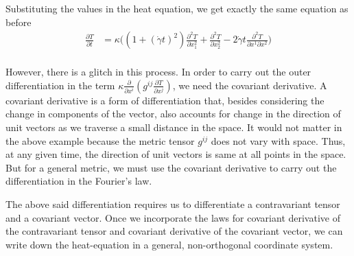 \documentclass[11pt, letterpaper]{article}
\newcommand{\1}{\bm{1}}
\newcommand{\gd}{\dot \gamma}
\newcommand{\pd}[2]{\frac{\partial #1}{\partial #2}}
\begin{document}
Substituting the values in the heat equation, we get exactly the same equation as before
\begin{align*}
\pd{T}{t} &= \kappa \bigg((1+(\gd t)^2)\pd{^2T}{x_1^2}+\pd{^2T}{x_2^2} - 2\gd t \pd{^2T}{x^1 \partial x^2} \bigg) \\
\end{align*}

However, there is a glitch in this process. In order to carry out the outer differentiation in the term $\kappa \pd{}{x^i}(g^{ij} \pd{T}{x^j})$, we need the covariant derivative. A covariant derivative is a form of differentiation that, besides considering the change in components of the vector, also accounts for change in the direction of unit vectors as we traverse a small distance in the space. It would not matter in the above example because the metric tensor $g^{ij}$ does not vary with space. Thus, at any given time, the direction of unit vectors is same at all points in the space. But for a general metric, we must use the covariant derivative to carry out the differentiation in the Fourier's law. 

The above said differentiation requires us to differentiate a contravariant tensor and a covariant vector. Once we incorporate the laws for covariant derivative of the contravariant tensor and covariant derivative of the covariant vector, we can write down the heat-equation in a general, non-orthogonal coordinate system.
\end{document}

